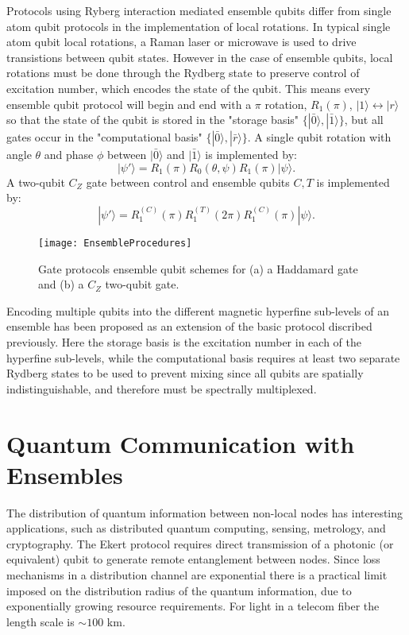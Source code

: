 Protocols using Ryberg interaction mediated ensemble qubits differ from single atom qubit protocols in the implementation of local rotations.
In typical single atom qubit local rotations, a Raman laser or microwave is used to drive transistions between qubit states\cite{IsenhowerUrbanZhangEtAl2010}.
However in the case of ensemble qubits, local rotations must be done through the Rydberg state to preserve control of excitation number, which encodes the state of the qubit.
This means every ensemble qubit protocol will begin and end with a $\pi$ rotation, $R_1(\pi)$, $|1\rangle \leftrightarrow |r\rangle$ so that the state of the qubit is stored in the "storage basis" $\{|\bar{0}\rangle,|\bar{1}\rangle\}$, but all gates occur in the "computational basis" $\{|\bar{0}\rangle,|\bar{r}\rangle\}$.
A single qubit rotation with angle $\theta$ and phase $\phi$ between $|\bar{0}\rangle$ and $|\bar{1}\rangle$ is implemented by:
$$|\psi'\rangle=R_1(\pi)R_0(\theta,\psi)R_1(\pi)|\psi\rangle.$$
A two-qubit $C_Z$ gate between control and ensemble qubits $C,T$ is implemented by:
$$|\psi'\rangle=R^{(C)}_1(\pi)R^{(T)}_1(2\pi)R^{(C)}_1(\pi)|\psi\rangle.$$

\begin{figure}
  \centering
  \label{fig_ensembleproto}
  \texttt{[image: EnsembleProcedures]}
  \caption{
    Gate protocols ensemble qubit schemes for (a) a Haddamard gate and (b) a $C_Z$ two-qubit gate.
  }
\end{figure}

Encoding multiple qubits into the different magnetic hyperfine sub-levels of an ensemble has been proposed as an extension of the basic protocol discribed previously\cite{LukinFleischhauerCoteEtAl2001,Brion2007}.
Here the storage basis is the excitation number in each of the hyperfine sub-levels, while the computational basis requires at least two separate Rydberg states to be used to prevent mixing since all qubits are spatially indistinguishable, and therefore must be spectrally multiplexed.

\section{Quantum Communication with Ensembles}
The distribution of quantum information between non-local nodes has interesting applications, such as distributed quantum computing\cite{Duan2004,Jiang2007}, sensing, metrology\cite{Komar2014,Komar2016}, and cryptography\cite{PhysRevLett.67.661}.
The Ekert protocol requires direct transmission of a photonic (or equivalent) qubit to generate remote entanglement between nodes.
Since loss mechanisms in a distribution channel are exponential there is a practical limit imposed on the distribution radius of the quantum information, due to exponentially growing resource requirements.
For light in a telecom fiber the length scale is $\sim 100$ km.

